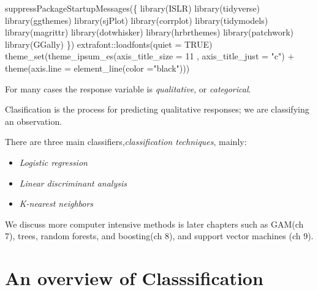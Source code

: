 \documentclass[
  letterpaper,
  DIV=11,
  numbers=noendperiod]{scrreprt}
\newenvironment{Shaded}{\begin{snugshade}}{\end{snugshade}}
\newcommand{\AttributeTok}[1]{\textcolor[rgb]{0.65,0.35,0.00}{#1}}
\newcommand{\ConstantTok}[1]{\textcolor[rgb]{0.85,0.12,0.09}{#1}}
\newcommand{\DecValTok}[1]{\textcolor[rgb]{0.47,0.16,0.63}{#1}}
\newcommand{\FunctionTok}[1]{\textcolor[rgb]{0.02,0.16,0.49}{#1}}
\newcommand{\NormalTok}[1]{\textcolor[rgb]{0.33,0.33,0.33}{#1}}
\newcommand{\SpecialCharTok}[1]{\textcolor[rgb]{0.00,0.46,0.62}{#1}}
\newcommand{\StringTok}[1]{\textcolor[rgb]{0.00,0.50,0.00}{#1}}
\providecommand{\tightlist}{%
  \setlength{\itemsep}{0pt}\setlength{\parskip}{0pt}}\usepackage{longtable,booktabs,array}
\begin{document}
\begin{Shaded}
\begin{Highlighting}[]
\FunctionTok{suppressPackageStartupMessages}\NormalTok{(\{}
\FunctionTok{library}\NormalTok{(ISLR)}
\FunctionTok{library}\NormalTok{(tidyverse)}
\FunctionTok{library}\NormalTok{(ggthemes)}
\FunctionTok{library}\NormalTok{(sjPlot)}
\FunctionTok{library}\NormalTok{(corrplot)}
\FunctionTok{library}\NormalTok{(tidymodels)}
\FunctionTok{library}\NormalTok{(magrittr)}
\FunctionTok{library}\NormalTok{(dotwhisker)}
\FunctionTok{library}\NormalTok{(hrbrthemes)}
\FunctionTok{library}\NormalTok{(patchwork)}
\FunctionTok{library}\NormalTok{(GGally)}
\NormalTok{\})}
\NormalTok{extrafont}\SpecialCharTok{::}\FunctionTok{loadfonts}\NormalTok{(}\AttributeTok{quiet =}  \ConstantTok{TRUE}\NormalTok{)}
\FunctionTok{theme\_set}\NormalTok{(}\FunctionTok{theme\_ipsum\_es}\NormalTok{(}\AttributeTok{axis\_title\_size =} \DecValTok{11}\NormalTok{ , }\AttributeTok{axis\_title\_just =} \StringTok{"c"}\NormalTok{) }\SpecialCharTok{+} \FunctionTok{theme}\NormalTok{(}\AttributeTok{axis.line =} \FunctionTok{element\_line}\NormalTok{(}\AttributeTok{color =}\StringTok{"black"}\NormalTok{)))}
\end{Highlighting}
\end{Shaded}

For many cases the response variable is \emph{qualitative}, or
\emph{categorical}.

Clasification is the process for predicting qualitative responses; we
are classifying an observation.

There are three main classifiers,\emph{classification techniques},
mainly:

\begin{itemize}
\tightlist
\item
  \emph{Logistic regression}
\item
  \emph{Linear discriminant analysis}
\item
  \emph{K-nearest neighbors}
\end{itemize}

We discuss more computer intensive methods is later chapters such as
GAM(ch 7), trees, random forests, and boosting(ch 8), and support vector
machines (ch 9).

\hypertarget{an-overview-of-classsification}{%
\section{An overview of
Classsification}\label{an-overview-of-classsification}}
\end{document}
